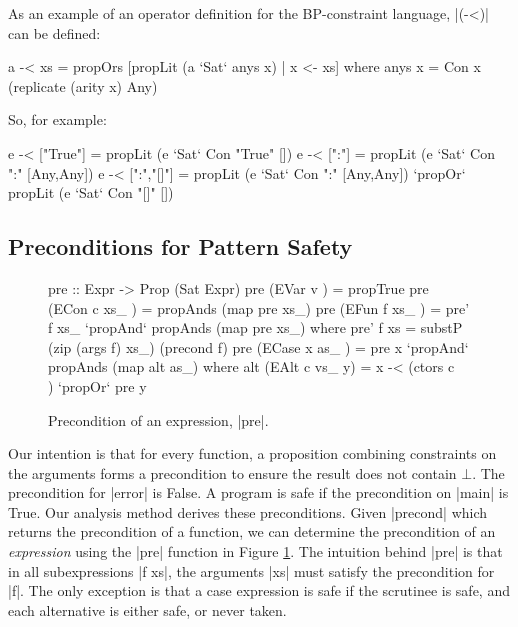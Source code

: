 As an example of an operator definition for the BP-constraint language, |(-<)| can be defined:

\begin{code}
a -< xs = propOrs [propLit (a `Sat` anys x) | x <- xs]
    where anys x = Con x (replicate (arity x) Any)
\end{code}

\noindent So, for example:

\begin{code}
e -< ["True"]    =  propLit (e `Sat` Con "True" [])
e -< [":"]       =  propLit (e `Sat` Con ":" [Any,Any])
e -< [":","[]"]  =  propLit (e `Sat` Con ":" [Any,Any]) `propOr`
                    propLit (e `Sat` Con "[]" [])
\end{code}

\subsection{Preconditions for Pattern Safety}
\label{secC:precond}

\begin{figure}
\begin{code}
pre ::  Expr -> Prop (Sat Expr)
pre (EVar v       ) = propTrue
pre (ECon c xs_   ) = propAnds (map pre xs_)
pre (EFun f xs_   ) = pre' f xs_ `propAnd` propAnds (map pre xs_)
    where pre' f xs = substP (zip (args f) xs_) (precond f)
pre (ECase x as_  ) = pre x `propAnd` propAnds (map alt as_)
    where alt (EAlt c vs_ y) = x -< (ctors c \\ [c]) `propOr` pre y
\end{code}
\caption{Precondition of an expression, |pre|.}
\label{figC:precondition}
\end{figure}

Our intention is that for every function, a proposition combining constraints on the arguments forms a precondition to ensure the result does not contain $\bot{}$. The precondition for |error| is False. A program is safe if the precondition on |main| is True. Our analysis method derives these preconditions. Given |precond| which returns the precondition of a function, we can determine the precondition of an \textit{expression} using the |pre| function in Figure \ref{figC:precondition}. The intuition behind |pre| is that in all subexpressions |f xs|, the arguments |xs| must satisfy the precondition for |f|. The only exception is that a case expression is safe if the scrutinee is safe, and each alternative is either safe, or never taken.

